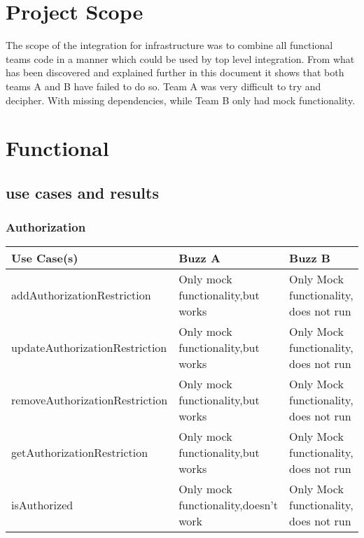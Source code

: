 \documentclass[12pt]{article}
\begin{document}
\section{Project Scope} %
The scope of the integration for infrastructure was to combine all functional teams code in a manner which could be used by top level integration. From what has been discovered and explained further in this document it shows that both teams A and B have failed to do so. Team A was very difficult to try and decipher. With missing dependencies, while Team B only had mock functionality.

\section{Functional} %
\subsection{use cases and results}

\subsubsection{Authorization}%
\begin{tabular}{|p{4.5cm}|p{4.5cm}|p{4.5cm}|}

\hline
Use Case(s) & Buzz A & Buzz B \\ 
\hline
addAuthorizationRestriction & Only mock functionality,but works & Only Mock functionality, does not run\\ %
\hline
updateAuthorizationRestriction & Only mock functionality,but works & Only Mock functionality, does not run\\ %
\hline
removeAuthorizationRestriction & Only mock functionality,but works & Only Mock functionality, does not run\\ %
\hline
getAuthorizationRestriction & Only mock functionality,but works & Only Mock functionality, does not run\\ %
\hline
isAuthorized & Only mock functionality,doesn't work & Only Mock functionality, does not run\\ %
\hline

\end{tabular}
\end{document}
